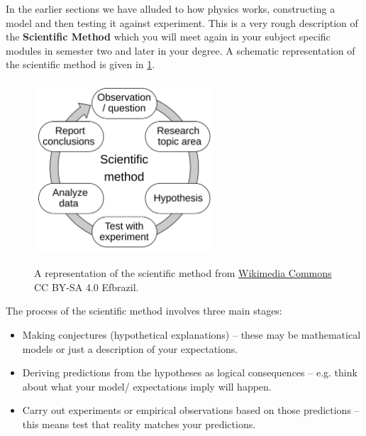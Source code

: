 \documentclass[a4paper,12pt]{book}
\begin{document}
In the earlier sections we have alluded to how physics works, constructing a model and then testing it against experiment. This is a very rough description of the \textbf{Scientific Method} which you will meet again in your subject specific modules in semester two and later in your degree. A schematic representation of the scientific method is given in \cref{fig2: scientific method}.
\begin{center}
\begin{figure}[ht]
    \includegraphics[width=0.6\textwidth,alt={A schematic of the scientific method as a cycle, image from Wikimedia commons.}]{figures/The_Scientific_Method.png}
    \caption{A representation of the scientific method from \href{https://commons.wikimedia.org/wiki/File:The_Scientific_Method.svg}{Wikimedia Commons} CC BY-SA 4.0 Efbrazil.}
    \label{fig2: scientific method}
\end{figure}
\end{center}
The process of the scientific method involves three main stages:
\begin{itemize}
\setlength{\itemsep}{-5pt}
    \item Making conjectures (hypothetical explanations) -- these may be mathematical models or just a description of your expectations.
    \item Deriving predictions from the hypotheses as logical consequences -- e.g. think about what your model/ expectations imply will happen.
    \item Carry out experiments or empirical observations based on those predictions -- this means test that reality matches your predictions.
\end{itemize}
\end{document}
